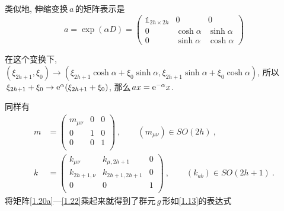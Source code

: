 类似地, 伸缩变换$\,a\,$的矩阵表示是
\begin{equation}
    a=\exp(\alpha D) =
    \begin{pmatrix}
        \mathds{1}_{2h\times 2h} & 0&  0 \\
        0  &\cosh \alpha & \sinh \alpha \\
        0 & \sinh \alpha & \cosh \alpha
    \end{pmatrix}  
\end{equation}
\begin{note}
    在这个变换下, $(\xi_{2h+1},\xi_{0})\to ( \xi_{2h+1}\cosh \alpha+\xi_{0}\sinh \alpha , \xi_{2h+1}\sinh \alpha+ \xi_{0}\cosh \alpha)$, 所以$\,\xi_{2h+1}+\xi_{0}\to \mathrm{e}^{\alpha}(\xi_{2h+1}+\xi_{0})$, 那么$\,a x= \mathrm{e}^{-\alpha}x$.
\end{note}
同样有
\begin{align}
    m&= \begin{pmatrix}
        m_{\mu\nu} & 0 & 0 \\
        0 & 1 & 0 \\
        0 & 0 & 1 \\
    \end{pmatrix} \:, \qquad (m_{\mu\nu})\in SO(2h) \:, \label{1.22} \\
    k&= \begin{pmatrix}
        k_{\mu\nu} & k_{\mu,2h+1} & 0 \\
        k_{2h+1,\nu} & k_{2h+1,2h+1} & 0 \\
        0 & 0 & 1 \\
    \end{pmatrix} \:, \qquad (k_{ab})\in SO(2h+1) \:. \label{1.22}
\end{align}
将矩阵\eqref{1.20a}---\eqref{1.22}乘起来就得到了群元$\,g\,$形如\eqref{1.13}的表达式
